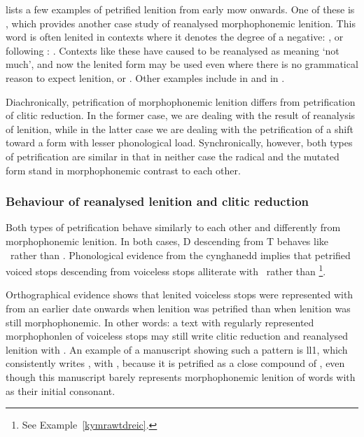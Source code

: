 \Textcite[448-451]{morgan_y_1952} lists a few examples of petrified lenition from early \gls{mow} onwards. One of these is , which provides another case study of reanalysed morphophonemic lenition. This word is often lenited in contexts where it denotes the degree of a negative: \eg {}, or following \oes: . Contexts like these have caused  to be reanalysed as meaning `not much', and now the lenited form may be used even where there is no grammatical reason to expect lenition, \eg {} or . Other examples include  in  and  in .

Diachronically, petrification of morphophonemic lenition differs from petrification of clitic reduction. 
In the former case, we are dealing with the result of reanalysis of lenition, while in the latter case we are dealing with the petrification of a shift toward a form with lesser phonological load. 
Synchronically, however, both types of petrification are similar in that in neither case the radical and the mutated form stand in morphophonemic contrast to each other. 

\subsubsection{Behaviour of reanalysed lenition and clitic reduction}
\label{sec:their-behaviour}
Both types of petrification behave similarly to each other and differently from morphophonemic lenition. 
In both cases, \gls{D} descending from \gls{T} behaves like \xD\ rather than \lT. Phonological evidence from the cynghanedd implies that petrified voiced stops descending from voiceless stops alliterate with \xD\ rather than \lT\footnote{See Example~\ref{kymrawtdreic}.}.

Orthographical evidence shows that lenited voiceless stops were represented with  from an earlier date onwards when lenition was petrified than when lenition was still morphophonemic. 
In other words: a text with regularly represented \gls{morphophonlen} of voiceless stops may still write clitic reduction and reanalysed lenition with . 
An example of a manuscript showing such a pattern is \gls{ll1}, which consistently writes , with , because it is petrified as a close compound of , even though this manuscript barely represents morphophonemic lenition of words with  as their initial consonant.

